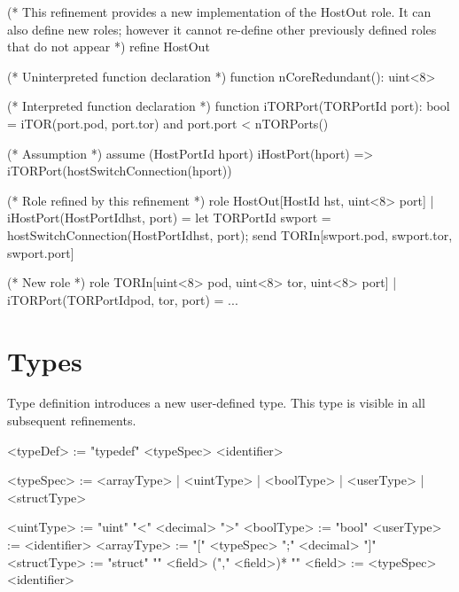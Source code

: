 \documentclass{report}
\begin{document}
\begin{ccnlisting}{}
(* This refinement provides a new implementation of the HostOut role.
   It can also define new roles; however it cannot re-define other 
   previously defined roles that do not appear *)
refine HostOut{ 

    (* Uninterpreted function declaration *)
    function nCoreRedundant(): uint<8>
    
    (* Interpreted function declaration *)
    function iTORPort(TORPortId port): bool = 
        iTOR(port.pod, port.tor) and port.port < nTORPorts()

    (* Assumption *)
    assume (HostPortId hport) 
           iHostPort(hport) => iTORPort(hostSwitchConnection(hport))

    (* Role refined by this refinement *)
    role HostOut[HostId hst, uint<8> port] 
    | iHostPort(HostPortId{hst, port}) = 
        let TORPortId swport = hostSwitchConnection(HostPortId{hst, port});
        send TORIn[swport.pod, swport.tor, swport.port]

    (* New role *)
    role TORIn[uint<8> pod, uint<8> tor, uint<8> port] 
    | iTORPort(TORPortId{pod, tor, port}) = 
        ...
}
\end{ccnlisting}
    


\section{Types}

Type definition introduces a new user-defined type.  This type is visible in all
subsequent refinements.

\begin{bnflisting}{}
<typeDef> := "typedef" <typeSpec> <identifier>
\end{bnflisting}

\begin{bnflisting}{}
<typeSpec> := <arrayType>
            | <uintType>
            | <boolType>
            | <userType>
            | <structType>
\end{bnflisting}

\begin{bnflisting}{}
<uintType>   := "uint" "<" <decimal> ">"
<boolType>   := "bool"
<userType>   := <identifier>
<arrayType>  := "[" <typeSpec> ";" <decimal> "]"
<structType> := "struct" "{" 
                 <field> ("," <field>)*
                "}"
<field> := <typeSpec> <identifier>
\end{bnflisting}
\end{document}
